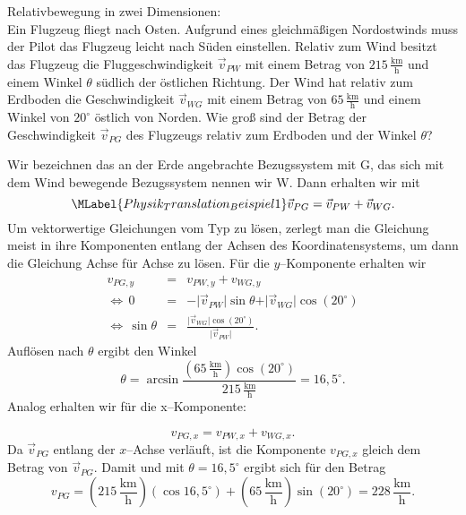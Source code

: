 \begin{MExercises}
      
     \begin{MExercise} Relativbewegung in zwei Dimensionen:\\
     Ein Flugzeug fliegt nach Osten. Aufgrund eines gleichm\"a{\ss}igen Nordostwinds muss der Pilot das Flugzeug leicht nach S\"uden einstellen. Relativ zum Wind besitzt das Flugzeug die Fluggeschwindigkeit $\vec{v}_{PW}$ mit einem Betrag von $215 \,\frac{\text{km}}{\text{h}}$ und einem Winkel $\theta$ s\"udlich der \"ostlichen Richtung. Der Wind hat relativ zum Erdboden die Geschwindigkeit 
     $\vec{v}_{WG}$ mit einem Betrag von $65 \,\frac{\text{km}}{\text{h}}$ und einem Winkel von $20^{\circ}$ \"ostlich von Norden. Wie gro{\ss} sind der Betrag der Geschwindigkeit $\vec{v}_{PG}$ des Flugzeugs relativ zum Erdboden und der Winkel $\theta$?
     
     
     \begin{MSolution}  Wir bezeichnen das an der Erde angebrachte Bezugssystem mit G, das sich mit dem Wind bewegende Bezugssystem nennen wir W. Dann erhalten wir mit  
     \begin{equation}\MLabel{Physik_Translation_Beispiel1}
     \vec{v}_{PG}=\vec{v}_{PW}+\vec{v}_{WG}.
     \end{equation}Um vektorwertige Gleichungen vom Typ  zu l\"osen, zerlegt man die Gleichung meist in ihre Komponenten entlang der Achsen des Koordinatensystems, um dann die Gleichung Achse f\"ur Achse zu l\"osen. F\"ur die $y$--Komponente erhalten wir
     \begin{eqnarray*}
          v_{PG,y}&=&v_{PW,y}+v_{WG,y}\\
          \Leftrightarrow\, 0&=&-\vert\vec{v}_{PW}\vert\sin \theta+\vert\vec{v}_{WG}\vert\cos(20^{\circ})\\
          \Leftrightarrow\, \sin\theta&=&\frac{\vert\vec{v}_{WG}\vert\cos(20^{\circ})}{\vert\vec{v}_{PW}\vert}.
     \end{eqnarray*}  Aufl\"osen nach $\theta$ ergibt den Winkel 
          $$
          \theta=\arcsin\frac{(65 \,\frac{\text{km}}{\text{h}})\cos(20^{\circ})}{215 \,\frac{\text{km}}{\text{h}}}=16,5^{\circ}.
          $$Analog erhalten wir f\"ur die x--Komponente:
           
               $$
               v_{PG,x}=v_{PW,x}+v_{WG,x}.
               $$ Da $\vec{v}_{PG}$ entlang der $x$--Achse verl\"auft, ist die Komponente $v_{PG,x}$ gleich dem Betrag von $\vec{v}_{PG}$. Damit und mit $\theta={{16,5}}^{\circ}$ ergibt sich f\"ur den Betrag
               $$
               {v}_{PG}=(215 \,\frac{\text{km}}{\text{h}})(\cos 16,5^{\circ})+(65\, \frac{\text{km}}{\text{h}})\sin(20^{\circ})=228 \,\frac{\text{km}}{\text{h}}.
               $$
               \end{MSolution}
               

\end{MExercise}
\end{MExercises}
